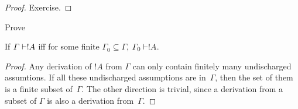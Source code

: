 \documentclass[../../../include/open-logic-section]{subfiles}
\begin{document}
\begin{proof}
Exercise.
\end{proof}

\begin{prob}
Prove 
\end{prob}

\begin{prop}
If $\Gamma \Proves !A$ iff for some finite $\Gamma_0 \subseteq
\Gamma$, $\Gamma_0 \Proves !A$.
\end{prop}

\begin{proof}
Any derivation of $!A$ from $\Gamma$ can only contain finitely many
undischarged assumtions.  If all these undischarged assumptions are
in~$\Gamma$, then the set of them is a finite subset of~$\Gamma$.  The
other direction is trivial, since a derivation from a subset of
$\Gamma$ is also a derivation from~$\Gamma$.
\end{proof}
\end{document}

